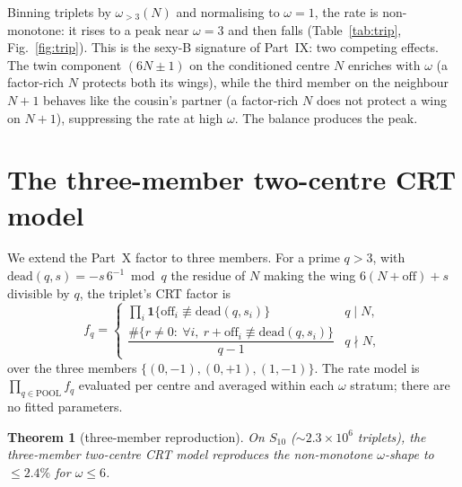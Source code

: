 \documentclass[11pt]{article}
\newtheorem{theorem}{Theorem}
\begin{document}
Binning triplets by $\omega_{>3}(N)$ and normalising to $\omega=1$, the rate is
non-monotone: it rises to a peak near $\omega=3$ and then falls
(Table~\ref{tab:trip}, Fig.~\ref{fig:trip}). This is the sexy-B signature of
Part~IX: two competing effects. The twin component $(6N\pm1)$ on the conditioned
centre $N$ enriches with $\omega$ (a factor-rich $N$ protects both its wings),
while the third member on the neighbour $N+1$ behaves like the cousin's partner
(a factor-rich $N$ does not protect a wing on $N+1$), suppressing the rate at high
$\omega$. The balance produces the peak.

\section{The three-member two-centre CRT model}

We extend the Part~X factor to three members. For a prime $q>3$, with
$\mathrm{dead}(q,s)=-s\,6^{-1}\bmod q$ the residue of $N$ making the wing $6(N+
\mathrm{off})+s$ divisible by $q$, the triplet's CRT factor is
\[
  f_q=\begin{cases}
   \prod_{i}\mathbf 1\{\mathrm{off}_i\not\equiv\mathrm{dead}(q,s_i)\} & q\mid N,\\
   \dfrac{\#\{r\neq0:\ \forall i,\ r+\mathrm{off}_i\not\equiv\mathrm{dead}(q,s_i)\}}{q-1} & q\nmid N,
  \end{cases}
\]
over the three members $\{(0,-1),(0,+1),(1,-1)\}$. The rate model is
$\prod_{q\in\mathrm{POOL}}f_q$ evaluated per centre and averaged within each
$\omega$ stratum; there are no fitted parameters.

\begin{theorem}[three-member reproduction]
On $S_{10}$ ($\sim2.3\times10^{6}$ triplets), the three-member two-centre CRT
model reproduces the non-monotone $\omega$-shape to $\le2.4\%$ for $\omega\le6$.
\end{theorem}
\end{document}
